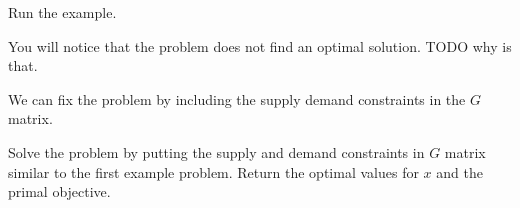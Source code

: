 Run the example.

You will notice that the problem does not find an optimal solution. TODO why is that.

We can fix the problem by including the supply demand constraints in the $G$ matrix.
\begin{problem}
Solve the problem by putting the supply and demand constraints in $G$ matrix similar to the first example problem. Return the optimal values for $x$ and the primal objective.
\end{problem}
\begin{comment}
\section*{Example}

Why are all of the terms in $G$ and $h$ non-positive?

\begin{lstlisting}
>>> from cvxopt import matrix, solvers
>>> G = matrix([ [-1., 0., 0., -1., 0.,  -1., 0., 0., 0., 0., 0.],
             [-1., 0., 0., 0., -1.,  0., -1., 0., 0., 0., 0.],
             [0., -1., 0., -1., 0.,  0., 0., -1., 0., 0., 0.],
             [0., -1., 0., 0., -1.,  0., 0., 0., -1., 0., 0.],
             [0., 0., -1., -1., 0.,  0., 0., 0., 0., -1., 0.],
             [0., 0., -1., 0., -1.,  0., 0., 0., 0., 0., -1.] ])

>>> h = matrix([-7., -2., -4., -5., -8.,  0., 0., 0., 0., 0., 0.,])
>>> c = matrix([4., 7., 6., 8., 8., 9])
>>> sol = solvers.lp(c,G,h)
>>> print sol['x']
>>> print sol['primal objective']
\end{lstlisting}

Another method is to use an integer linear program.
Cvxopt is configured to work with  Gnu, which does have an integer linear program.
It will work with either of the methods above. 

\textbf{Example}

glpk.ilp returns a tuple.
The first entry describes the optimality of the result, while the second gives the $x$ values.

\begin{lstlisting}
>>> from cvxopt import matrix, solvers, glpk
>>> G = matrix([ [-1., 0., 0., -1., 0.,  -1., 0., 0., 0., 0., 0.],
             [-1., 0., 0., 0., -1.,  0., -1., 0., 0., 0., 0.],
             [0., -1., 0., -1., 0.,  0., 0., -1., 0., 0., 0.],
             [0., -1., 0., 0., -1.,  0., 0., 0., -1., 0., 0.],
             [0., 0., -1., -1., 0.,  0., 0., 0., 0., -1., 0.],
             [0., 0., -1., 0., -1.,  0., 0., 0., 0., 0., -1.] ])


\end{comment}

